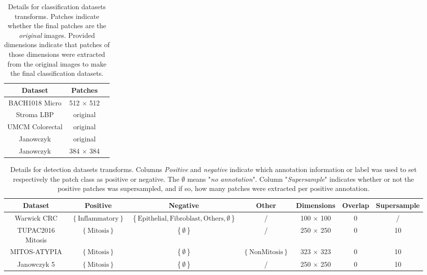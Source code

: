 \begin{table}
\center
\caption{Details for classification datasets transforms. Patches indicate whether the final patches are the \textit{original} images. Provided dimensions indicate that patches of those dimensions were extracted from the original images to make the final classification datasets.}
\label{app:mtask:tab:app:details_trans_clf}
\begin{tabular}{|c|c|c|}
\hline
Dataset & Patches \\
\hline
BACH1018 Micro & 512 $\times$ 512 \\
Stroma LBP & original \\
UMCM Colorectal & original \\
Janowczyk & original \\ 
Janowczyk & 384 $\times$ 384 \\
\hline
\end{tabular}
\end{table}

\begin{table*}[t]
\center
\caption{Details for detection datasets transforms. Columns \textit{Positive} and \textit{negative} indicate which annotation information or label was used to set respectively the patch class as positive or negative. The $\emptyset$ means "\textit{no annotation}". Column "\textit{Supersample}" indicates whether or not the positive patches was supersampled, and if so, how many patches were extracted per positive annotation.  }
\label{app:mtask:tab:app:details_trans_det}
\begin{tabular}{|c|c|c|c|c|c|c|}
\hline
Dataset & Positive & Negative & Other & Dimensions & Overlap & Supersample \\
\hline
Warwick CRC & {\small $\left\{\text{Inflammatory}\right\}$} & {\small $\left\{\text{Epithelial}, \text{Fibroblast}, \text{Others}, \emptyset\right\}$} & / & 100 $\times$ 100 & 0 & / \\
TUPAC2016 Mitosis & {\small $\left\{\text{Mitosis}\right\}$} & {\small $\left\{\emptyset\right\}$} & / & 250 $\times$ 250 & 0 & 10 \\
MITOS-ATYPIA & {\small $\left\{\text{Mitosis}\right\}$} & {\small $\left\{\emptyset\right\}$} & {$\left\{\text{NonMitosis}\right\}$} & 323 $\times$ 323 & 0 & 10 \\
Janowczyk 5 & {\small $\left\{\text{Mitosis}\right\}$} & {\small $\left\{\emptyset\right\}$} & / & 250 $\times$ 250 & 0 & 10 \\
\hline
\end{tabular}
\end{table*}


